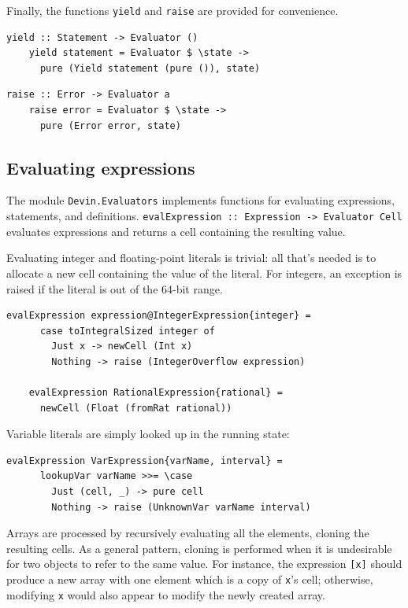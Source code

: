 \documentclass[UdineBachThesis,american,11pt]{PhdThesis}
\begin{document}
  Finally, the functions \mbox{\texttt{yield}} and \mbox{\texttt{raise}} are
  provided for convenience.

  \begin{Verbatim}[gobble=4,fontsize=\small]
    yield :: Statement -> Evaluator ()
    yield statement = Evaluator $ \state ->
      pure (Yield statement (pure ()), state)
  \end{Verbatim}

  \pagebreak

  \begin{Verbatim}[gobble=4,fontsize=\small]
    raise :: Error -> Evaluator a
    raise error = Evaluator $ \state ->
      pure (Error error, state)
  \end{Verbatim}

  \subsection{Evaluating expressions}

  The module \mbox{\texttt{Devin.Evaluators}} implements functions for
  evaluating expressions, statements, and definitions.
  \mbox{\texttt{evalExpression :: Expression -> Evaluator Cell}} evaluates
  expressions and returns a cell containing the resulting value.

  Evaluating integer and floating-point literals is trivial: all that's needed
  is to allocate a new cell containing the value of the literal. For integers,
  an exception is raised if the literal is out of the 64-bit range.

  \begin{Verbatim}[gobble=4,fontsize=\small]
    evalExpression expression@IntegerExpression{integer} =
      case toIntegralSized integer of
        Just x -> newCell (Int x)
        Nothing -> raise (IntegerOverflow expression)

    evalExpression RationalExpression{rational} =
      newCell (Float (fromRat rational))
  \end{Verbatim}

  Variable literals are simply looked up in the running state:

  \begin{Verbatim}[gobble=4,fontsize=\small]
    evalExpression VarExpression{varName, interval} =
      lookupVar varName >>= \case
        Just (cell, _) -> pure cell
        Nothing -> raise (UnknownVar varName interval)
  \end{Verbatim}

  Arrays are processed by recursively evaluating all the elements, cloning the
  resulting cells. As a general pattern, cloning is performed when it is
  undesirable for two objects to refer to the same value. For instance, the
  expression \mbox{\texttt{[x]}} should produce a new array with one element
  which is a copy of \texttt{x}'s cell; otherwise, modifying \texttt{x} would
  also appear to modify the newly created array.
\end{document}
